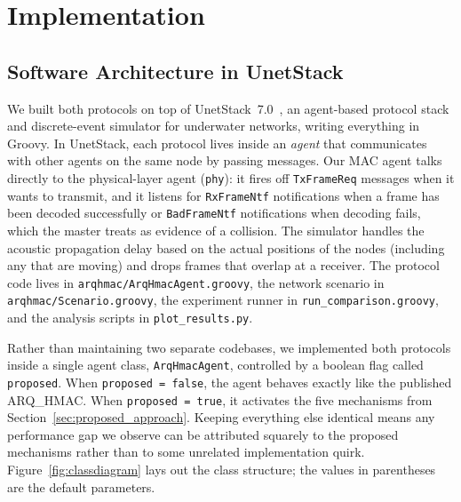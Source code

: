 \documentclass{article}
\begin{document}
\section{Implementation} \label{sec:implementation}

\subsection{Software Architecture in UnetStack}
We built both protocols on top of UnetStack~7.0~\cite{unetstack2014}, an agent-based protocol stack and discrete-event simulator for underwater networks, writing everything in Groovy. In UnetStack, each protocol lives inside an \emph{agent} that communicates with other agents on the same node by passing messages. Our MAC agent talks directly to the physical-layer agent (\texttt{phy}): it fires off \texttt{TxFrameReq} messages when it wants to transmit, and it listens for \texttt{RxFrameNtf} notifications when a frame has been decoded successfully or \texttt{BadFrameNtf} notifications when decoding fails, which the master treats as evidence of a collision. The simulator handles the acoustic propagation delay based on the actual positions of the nodes (including any that are moving) and drops frames that overlap at a receiver. The protocol code lives in \texttt{arqhmac/ArqHmacAgent.groovy}, the network scenario in \texttt{arqhmac/Scenario.groovy}, the experiment runner in \texttt{run\_comparison.groovy}, and the analysis scripts in \texttt{plot\_results.py}.

Rather than maintaining two separate codebases, we implemented both protocols inside a single agent class, \texttt{ArqHmacAgent}, controlled by a boolean flag called \texttt{proposed}. When \texttt{proposed = false}, the agent behaves exactly like the published ARQ\_HMAC. When \texttt{proposed = true}, it activates the five mechanisms from Section~\ref{sec:proposed_approach}. Keeping everything else identical means any performance gap we observe can be attributed squarely to the proposed mechanisms rather than to some unrelated implementation quirk. Figure~\ref{fig:classdiagram} lays out the class structure; the values in parentheses are the default parameters.
\end{document}
